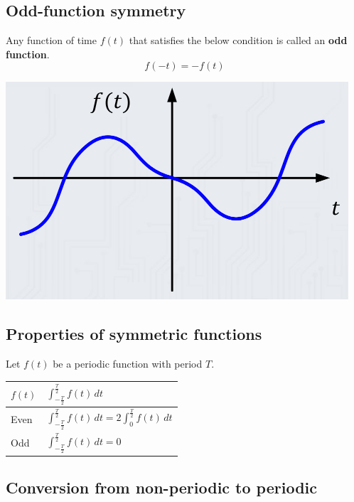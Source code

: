 \documentclass[11pt]{article}
\begin{document}
 \newpage
\subsection{Odd-function symmetry}
\label{sec:orgff04d59}
Any function of time \(f(t)\) that satisfies the below condition is called an \textbf{odd function}.
\[f(-t) = - f(t)\]

\begin{center}
\includegraphics[width=.9\linewidth]{./images/odd-function-symmetry.png}
\end{center}
\subsection{Properties of symmetric functions}
\label{sec:org6d27757}
Let \(f(t)\) be a periodic function with period \(T\).

\begin{center}
\begin{tabular}{l|l}
\(f(t)\) & \(\int_{-\frac{T}{2}}^{\frac{T}{2}} f(t) \, dt\)\\
\hline
Even & \(\int_{-\frac{T}{2}}^{\frac{T}{2}} f(t) \, dt = 2 \int_0^{\frac{T}{2}} f(t) \, dt\)\\
Odd & \(\int_{-\frac{T}{2}}^{\frac{T}{2}} f(t) \, dt = 0\)\\
\end{tabular}
\end{center}
\subsection{Conversion from non-periodic to periodic}
\label{sec:org1cc05c3}
\end{document}
